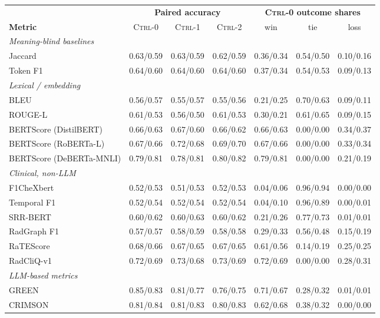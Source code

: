 \begin{tabular}{lcccccc}
\toprule
 & \multicolumn{3}{c}{\textbf{Paired accuracy}} & \multicolumn{3}{c}{\textbf{\textsc{Ctrl-0} outcome shares}} \\
\cmidrule(lr){2-4}\cmidrule(lr){5-7}
\textbf{Metric} & \textsc{Ctrl-0} & \textsc{Ctrl-1} & \textsc{Ctrl-2} & win & tie & loss \\
\midrule
\multicolumn{7}{l}{\textit{Meaning-blind baselines}} \\
Jaccard & 0.63/0.59 & 0.63/0.59 & 0.62/0.59 & 0.36/0.34 & 0.54/0.50 & 0.10/0.16 \\
Token F1 & 0.64/0.60 & 0.64/0.60 & 0.64/0.60 & 0.37/0.34 & 0.54/0.53 & 0.09/0.13 \\
\multicolumn{7}{l}{\textit{Lexical / embedding}} \\
BLEU & 0.56/0.57 & 0.55/0.57 & 0.55/0.56 & 0.21/0.25 & 0.70/0.63 & 0.09/0.11 \\
ROUGE-L & 0.61/0.53 & 0.56/0.50 & 0.61/0.53 & 0.30/0.21 & 0.61/0.65 & 0.09/0.15 \\
BERTScore (DistilBERT) & 0.66/0.63 & 0.67/0.60 & 0.66/0.62 & 0.66/0.63 & 0.00/0.00 & 0.34/0.37 \\
BERTScore (RoBERTa-L) & 0.67/0.66 & 0.72/0.68 & 0.69/0.70 & 0.67/0.66 & 0.00/0.00 & 0.33/0.34 \\
BERTScore (DeBERTa-MNLI) & 0.79/0.81 & 0.78/0.81 & 0.80/0.82 & 0.79/0.81 & 0.00/0.00 & 0.21/0.19 \\
\multicolumn{7}{l}{\textit{Clinical, non-LLM}} \\
F1CheXbert & 0.52/0.53 & 0.51/0.53 & 0.52/0.53 & 0.04/0.06 & 0.96/0.94 & 0.00/0.00 \\
Temporal F1 & 0.52/0.54 & 0.52/0.54 & 0.52/0.54 & 0.04/0.10 & 0.96/0.89 & 0.00/0.01 \\
SRR-BERT & 0.60/0.62 & 0.60/0.63 & 0.60/0.62 & 0.21/0.26 & 0.77/0.73 & 0.01/0.01 \\
RadGraph F1 & 0.57/0.57 & 0.58/0.59 & 0.58/0.58 & 0.29/0.33 & 0.56/0.48 & 0.15/0.19 \\
RaTEScore & 0.68/0.66 & 0.67/0.65 & 0.67/0.65 & 0.61/0.56 & 0.14/0.19 & 0.25/0.25 \\
RadCliQ-v1 & 0.72/0.69 & 0.73/0.68 & 0.73/0.69 & 0.72/0.69 & 0.00/0.00 & 0.28/0.31 \\
\multicolumn{7}{l}{\textit{LLM-based metrics}} \\
GREEN & 0.85/0.83 & 0.81/0.77 & 0.76/0.75 & 0.71/0.67 & 0.28/0.32 & 0.01/0.01 \\
CRIMSON & 0.81/0.84 & 0.81/0.83 & 0.80/0.83 & 0.62/0.68 & 0.38/0.32 & 0.00/0.00 \\

\end{tabular}
